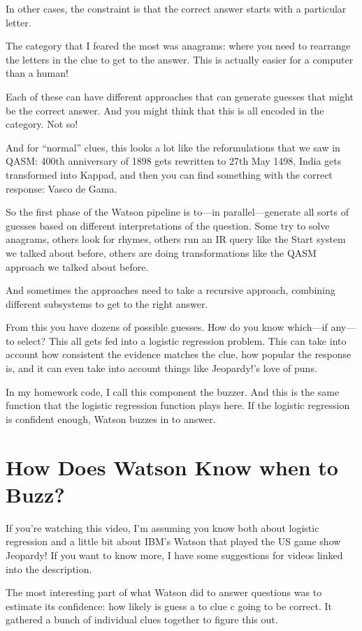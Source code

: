 In other cases, the constraint is that the correct answer starts with a particular letter.  

The category that I feared the most was anagrams: where you need to rearrange the letters in the clue to get to the answer.  This is actually easier for a computer than a human!

Each of these can have different approaches that can generate guesses that
might be the correct answer.  And you might think that this is all encoded in
the category.  Not so!

And for “normal” clues, this looks a lot like the reformulations that we saw in QASM: 400th anniversary of 1898 gets rewritten to 27th May 1498, India gets transformed into Kappad, and then you can find something with the correct response: Vasco de Gama.

So the first phase of the Watson pipeline is to—in parallel—generate all sorts of guesses based on different interpretations of the question.  Some try to solve anagrams, others look for rhymes, others run an IR query like the Start system we talked about before, others are doing transformations like the QASM approach we talked about before.  

And sometimes the approaches need to take a recursive approach, combining different subsystems to get to the right answer.

From this you have dozens of possible guesses.  How do you know which—if any—to select?  This all gets fed into a logistic regression problem.  This can take into account how consistent the evidence matches the clue, how popular the response is, and it can even take into account things like Jeopardy!’s love of puns.

In my homework code, I call this component the buzzer.  And this is the same function that the logistic regression function plays here.  If the logistic regression is confident enough, Watson buzzes in to answer.

\section{How Does Watson Know when to Buzz?}

If you’re watching this video, I’m assuming you know both about logistic regression and a little bit about IBM’s Watson that played the US game show Jeopardy!  If you want to know more, I have some suggestions for videos linked into the description.

The most interesting part of what Watson did to answer questions was to estimate its confidence: how likely is guess a to clue c going to be correct.  It gathered a bunch of individual clues together to figure this out.  

